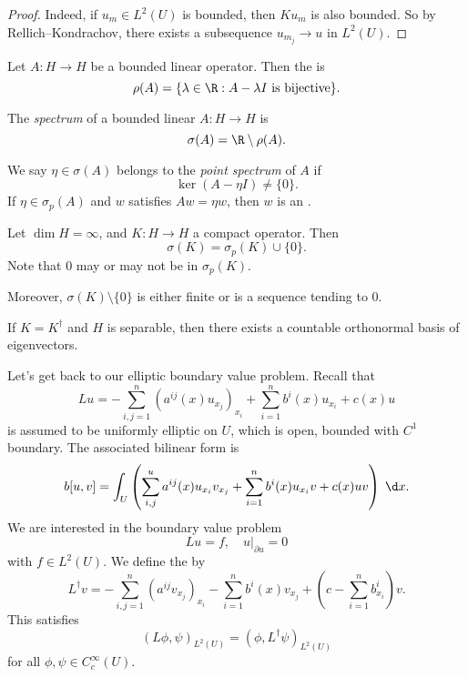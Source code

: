 \documentclass[a4paper]{article}
\begin{document}
\begin{proof}
  Indeed, if $u_m \in L^2(U)$ is bounded, then $K u_m$ is also bounded. So by Rellich--Kondrachov, there exists a subsequence $u_{m_j} \to u$ in $L^2(U)$.
\end{proof}

\begin{defi}
  Let $A: H \to H$ be a bounded linear operator. Then the  is
  \[
    \rho(A) = \{\lambda \in \R: A - \lambda I\text{ is bijective}\}.
  \]
\end{defi}

\begin{defi}[Spectrum]
  The \emph{spectrum} of a bounded linear $A: H \to H$ is
  \[
    \sigma(A) = \R \setminus \rho(A).
  \]
\end{defi}

\begin{defi}
  We say $\eta \in \sigma (A)$ belongs to the \emph{point spectrum} of $A$ if
  \[
    \ker (A - \eta I) \not= \{0\}.
  \]
  If $\eta \in \sigma_p(A)$ and $w$ satisfies $A w = \eta w$, then $w$ is an .
\end{defi}

\begin{thm}
  Let $\dim H = \infty$, and $K: H \to H$ a compact operator. Then
  \[
    \sigma(K) = \sigma_p(K) \cup \{0\}.
  \]
  Note that $0$ may or may not be in $\sigma_p(K)$.

  Moreover, $\sigma(K) \setminus \{0\}$ is either finite or is a sequence tending to $0$.

  If $K = K^\dagger$ and $H$ is separable, then there exists a countable orthonormal basis of eigenvectors.
\end{thm}

Let's get back to our elliptic boundary value problem. Recall that
\[
  Lu = - \sum_{i, j = 1}^n (a^{ij}(x) u_{x_j})_{x_i} + \sum_{i = 1}^n b^i(x) u_{x_i} + c(x) u
\]
is assumed to be uniformly elliptic on $U$, which is open, bounded with $C^1$ boundary. The associated bilinear form is
\[
  b[u, v] = \int_U \left(\sum_{i, j}^u a^{ij}(x) u_{x_i} v_{x_j} + \sum_{i = 1}^n b^i(x) u_{x_i} v + c(x) uv\right)\;\d x.
\]
We are interested in the boundary value problem
\[
  Lu = f,\quad u|_{\partial u} = 0
\]
with $f \in L^2(U)$. We define the  by
\[
  L^\dagger v = - \sum_{i, j = 1}^n (a^{ij} v_{x_j})_{x_i} - \sum_{i = 1}^n b^i(x) v_{x_j} + \left(c - \sum_{i = 1}^n b^i_{x_i}\right)v.
\]
This satisfies
\[
  (L\phi, \psi)_{L^2(U)} = (\phi, L^\dagger \psi)_{L^2(U)}
\]
for all $\phi, \psi \in C_c^\infty(U)$.
\end{document}
